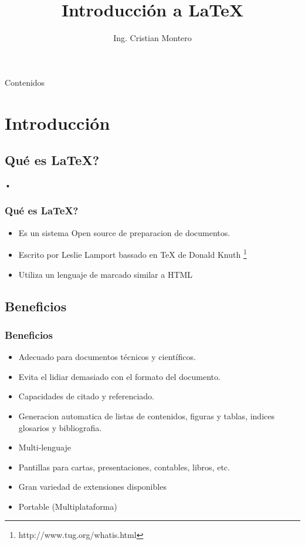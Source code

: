 \documentclass[18pt, spanish]{beamer}
\author{Ing. Cristian Montero}
\title{Introducción a \LaTeX}
\institute{ResBaz 2016}
\date{}
\begin{document}
\begin{frame}
\titlepage
\end{frame}

\begin{frame}{Contenidos}
\tableofcontents
\end{frame}

\section{Introducción}
\subsection{Qué es \LaTeX?}
\begin{frame}{•}
\frametitle{Qué es \LaTeX?}
\begin{itemize}
	\item Es un sistema Open source de preparacion de documentos.
	\item Escrito por Leslie Lamport bassado en TeX de Donald Knuth \footnote{http://www.tug.org/whatis.html}
	\item Utiliza un lenguaje de marcado similar a HTML
	
\end{itemize}
\end{frame}

\subsection{Beneficios}
\begin{frame}
\frametitle{Beneficios}
\begin{itemize}
	\item Adecuado para documentos técnicos y científicos.
	\item Evita el lidiar demasiado con el formato del documento.	
	\item Capacidades de citado y referenciado.
	\item Generacion automatica de listas de contenidos, figuras y tablas, indices glosarios y bibliografia.
	\item Multi-lenguaje
	\item Pantillas para cartas, presentaciones, contables, libros, etc.
	\item Gran variedad de extensiones disponibles
	\item Portable (Multiplataforma)
\end{itemize}
\end{frame}
\end{document}

